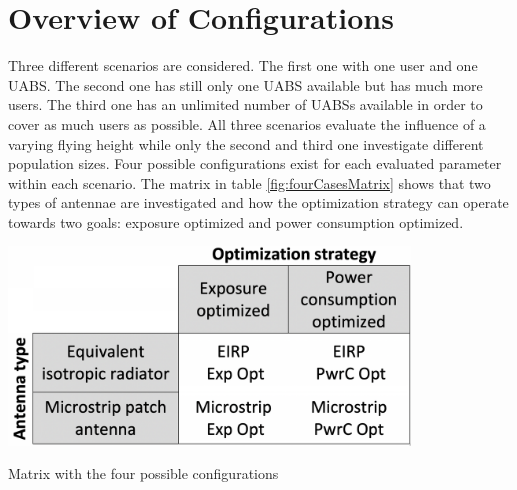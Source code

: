 \section{Overview of Configurations}
Three different scenarios are considered. The first one with one user and one \gls{UABS}. The second one has 
still only one \gls{UABS} available but has much more users. The third one has an unlimited number of \gls{UABS}s 
available in order to cover as much users as possible.
All three scenarios evaluate the influence of a varying flying height while only the second and third one 
investigate different population sizes.
Four possible configurations exist for each evaluated parameter within each scenario.
The matrix in table \ref{fig:fourCasesMatrix} shows that two types of antennae are investigated and how the optimization
strategy can operate towards two goals: exposure optimized and power consumption optimized.

\begin{table}[h!]
\centering
  \includegraphics[width=0.8\textwidth]{../images/fourCasesMatrix.png}
  \caption{Matrix with the four possible configurations}
  \label{fig:fourCasesMatrix}
\end{table}

